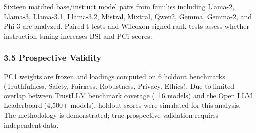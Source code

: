Sixteen matched base/instruct model pairs from families including Llama-2, Llama-3, Llama-3.1, Llama-3.2, Mistral, Mixtral, Qwen2, Gemma, Gemma-2, and Phi-3 are analyzed. Paired t-tests and Wilcoxon signed-rank tests assess whether instruction-tuning increases BSI and PC1 scores.

\subsubsection{3.5 Prospective Validity}

PC1 weights are frozen and loadings computed on 6 holdout benchmarks (Truthfulness, Safety, Fairness, Robustness, Privacy, Ethics). Due to limited overlap between TrustLLM benchmark coverage (~16 models) and the Open LLM Leaderboard (4,500+ models), holdout scores were simulated for this analysis. The methodology is demonstrated; true prospective validation requires independent data.
